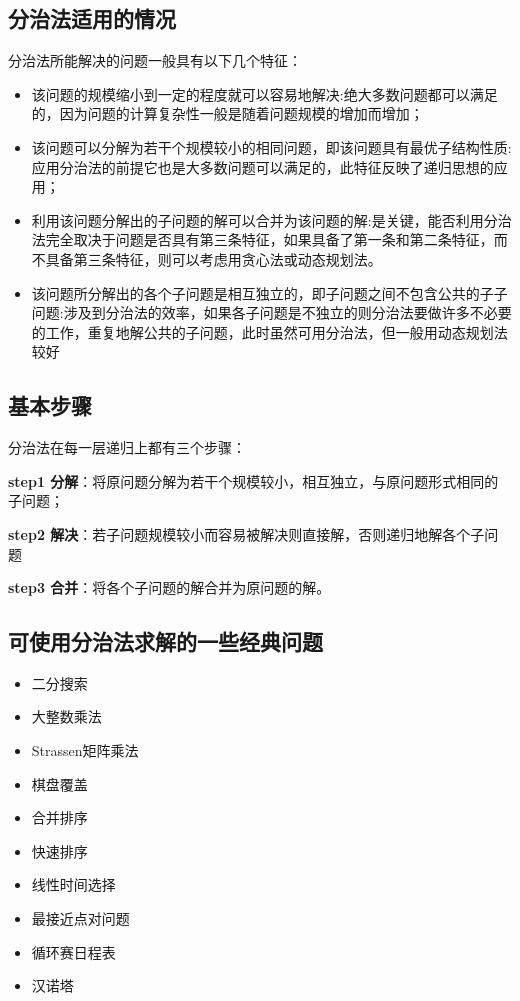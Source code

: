 \documentclass[UTF8,a4paper,12pt]{ctexbook}
\begin{document}
		\subsection{分治法适用的情况}
			分治法所能解决的问题一般具有以下几个特征：
			\begin{itemize}
				\item 该问题的规模缩小到一定的程度就可以容易地解决:绝大多数问题都可以满足的，因为问题的计算复杂性一般是随着问题规模的增加而增加；
				\item 该问题可以分解为若干个规模较小的相同问题，即该问题具有最优子结构性质:应用分治法的前提它也是大多数问题可以满足的，此特征反映了递归思想的应用；
				\item 利用该问题分解出的子问题的解可以合并为该问题的解:是关键，能否利用分治法完全取决于问题是否具有第三条特征，如果具备了第一条和第二条特征，而不具备第三条特征，则可以考虑用贪心法或动态规划法。
				\item 该问题所分解出的各个子问题是相互独立的，即子问题之间不包含公共的子子问题:涉及到分治法的效率，如果各子问题是不独立的则分治法要做许多不必要的工作，重复地解公共的子问题，此时虽然可用分治法，但一般用动态规划法较好
			\end{itemize}
		\subsection{基本步骤}
			分治法在每一层递归上都有三个步骤：
			
			\textbf{step1 分解}：将原问题分解为若干个规模较小，相互独立，与原问题形式相同的子问题；
			
			\textbf{step2 解决}：若子问题规模较小而容易被解决则直接解，否则递归地解各个子问题
			
			\textbf{step3 合并}：将各个子问题的解合并为原问题的解。
			
		\subsection{可使用分治法求解的一些经典问题}
			\begin{itemize}
				\item 二分搜索
				\item 大整数乘法
				\item Strassen矩阵乘法
				\item 棋盘覆盖
				\item 合并排序
				\item 快速排序
				\item 线性时间选择
				\item 最接近点对问题
				\item 循环赛日程表
				\item 汉诺塔
			\end{itemize}
\end{document}
